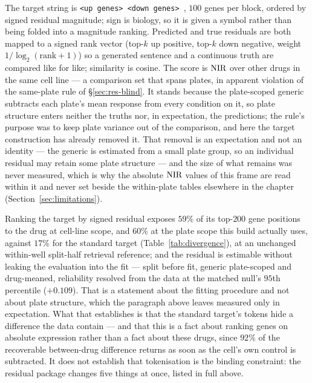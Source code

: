 The target string is \texttt{<up genes> \DOWN{} <down genes> \ENDCELL}, $100$ genes per block,
ordered by signed residual magnitude; sign is biology, so it is given a symbol rather than being
folded into a magnitude ranking. Predicted and true residuals are both mapped to a signed rank
vector (top-$k$ up positive, top-$k$ down negative, weight $1/\log_2(\textrm{rank}+1)$) so a
generated sentence and a continuous truth are compared like for like; similarity is cosine. The
score is $\textrm{NIR}$ over other drugs in the same cell line --- a comparison set that spans plates, in
apparent violation of the same-plate rule of \S\ref{sec:res-blind}. It stands because the
plate-scoped generic subtracts each plate's mean response from every condition on it, so plate
structure enters neither the truths nor, in expectation, the predictions; the rule's purpose was to
keep plate variance out of the comparison, and here the target construction has already removed it.
That removal is an expectation and not an identity --- the generic is estimated from a small plate
group, so an individual residual may retain some plate structure --- and the size of what remains was
never measured, which is why the absolute $\textrm{NIR}$ values of this frame are read within it and never
set beside the within-plate tables elsewhere in the chapter (Section~\ref{sec:limitations}).



\begin{claim}
Ranking the target by signed residual exposes $59\%$ of its top-$200$ gene positions to the drug at
cell-line scope, and $60\%$ at the plate scope this build actually uses, against $17\%$ for the
standard target (Table~\ref{tab:divergence}), at an unchanged within-well split-half retrieval
reference; and the residual is estimable
without leaking the evaluation into the fit --- split before fit, generic plate-scoped and
drug-meaned, reliability resolved from the data at the matched null's $95$th percentile
($+0.109$). That is a statement about the fitting procedure and not about plate structure, which
the paragraph above leaves measured only in expectation. What that establishes is that the
standard target's tokens hide a difference the data contain --- and that this is a fact about
ranking genes on absolute expression rather than a fact about these drugs, since $92\%$ of the
recoverable between-drug difference returns as soon as the cell's own control is subtracted. It
does not establish that tokenisation is the binding constraint: the residual package changes five
things at once, listed in full above.
\end{claim}

